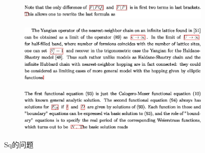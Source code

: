 \begin{figure}[hp]
    \centering

    \begin{subfigure}[b]{\linewidth}
    \centering
    \includegraphics[scale=0.3]{eps/sq1.eps}
    \caption{\label{fig:fig1}}
    \end{subfigure}

    \begin{subfigure}[b]{\linewidth}
    \centering
    \includegraphics[scale=0.3]{eps/sq2.eps}
    \caption{\label{fig:fig2}}
    \end{subfigure}

    \begin{subfigure}[b]{\linewidth}
    \centering
    \includegraphics[scale=0.3]{eps/sq3.eps}
    \caption{\label{fig:fig3}}
    \end{subfigure}

    
    \caption{Sq的问题}
    \label{fig:label}
\end{figure}
